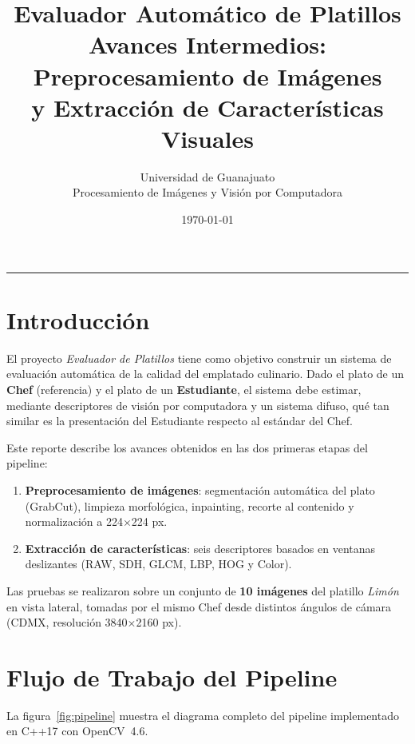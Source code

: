 \documentclass[12pt,a4paper]{article}
\title{%
  \textcolor{ugBlue}{\textbf{Evaluador Automático de Platillos}}\\[4pt]
  \large Avances Intermedios: Preprocesamiento de Imágenes\\
  y Extracción de Características Visuales
}
\author{%
  Universidad de Guanajuato\\
  Procesamiento de Imágenes y Visión por Computadora
}
\date{\today}
\begin{document}
\maketitle
\tableofcontents
\vspace{1em}
\hrule
\vspace{1em}

\section{Introducción}

El proyecto \textit{Evaluador de Platillos} tiene como objetivo
construir un sistema de evaluación automática de la calidad del
emplatado culinario.  Dado el plato de un \textbf{Chef} (referencia)
y el plato de un \textbf{Estudiante}, el sistema debe estimar,
mediante descriptores de visión por computadora y un sistema difuso,
qué tan similar es la presentación del Estudiante respecto al estándar
del Chef.

Este reporte describe los avances obtenidos en las dos primeras etapas
del pipeline:
\begin{enumerate}[nosep]
  \item \textbf{Preprocesamiento de imágenes}: segmentación automática
        del plato (GrabCut), limpieza morfológica, inpainting, recorte
        al contenido y normalización a 224$\times$224 px.
  \item \textbf{Extracción de características}: seis descriptores
        basados en ventanas deslizantes (RAW, SDH, GLCM, LBP, HOG y
        Color).
\end{enumerate}

Las pruebas se realizaron sobre un conjunto de \textbf{10 imágenes}
del platillo \textit{Limón} en vista lateral, tomadas por el mismo
Chef desde distintos ángulos de cámara (CDMX, resolución 3840×2160
px).

\section{Flujo de Trabajo del Pipeline}

La figura~\ref{fig:pipeline} muestra el diagrama completo del
pipeline implementado en C++17 con OpenCV~4.6.
\end{document}
